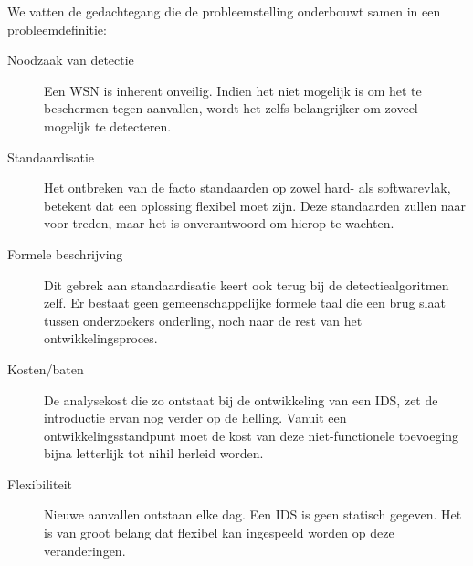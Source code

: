 We vatten de gedachtegang die de probleemstelling onderbouwt samen in een
probleemdefinitie:

\begin{description}

  \item[Noodzaak van detectie] Een WSN is inherent onveilig. Indien het niet
  mogelijk is om het te beschermen tegen aanvallen, wordt het zelfs
  belangrijker om zoveel mogelijk te detecteren.

  \item[Standaardisatie] Het ontbreken van de facto standaarden op zowel hard-
  als softwarevlak, betekent dat een oplossing flexibel moet zijn. Deze
  standaarden zullen naar voor treden, maar het is onverantwoord om hierop te
  wachten.

  \item[Formele beschrijving] Dit gebrek aan standaardisatie keert ook terug
  bij de detectiealgoritmen zelf. Er bestaat geen gemeenschappelijke formele
  taal die een brug slaat tussen onderzoekers onderling, noch naar de rest van
  het ontwikkelingsproces.

  \item[Kosten/baten] De analysekost die zo ontstaat bij de ontwikkeling van
  een IDS, zet de introductie ervan nog verder op de helling. Vanuit een
  ontwikkelingsstandpunt moet de kost van deze niet-functionele toevoeging
  bijna letterlijk tot nihil herleid worden.

  \item[Flexibiliteit] Nieuwe aanvallen ontstaan elke dag. Een IDS is geen
  statisch gegeven. Het is van groot belang dat flexibel kan ingespeeld worden
  op deze veranderingen.

\end{description}
